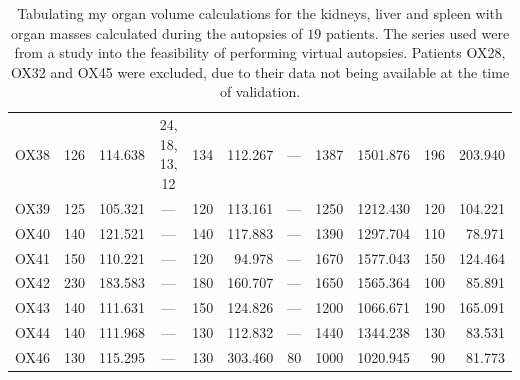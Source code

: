 \begin{landscape}
\begin{table}[p]
\begin{center}
\begin{tabular}{c|rrc|rrc|rr|rr}
OX38 & 126 & 114.638 & 24, 18, 13, 12 & 134 & 112.267 &                            --- & 1387 & 1501.876 & 196 & 203.940 \\
OX39 & 125 & 105.321 &            --- & 120 & 113.161 &                            --- & 1250 & 1212.430 & 120 & 104.221 \\
OX40 & 140 & 121.521 &            --- & 140 & 117.883 &                            --- & 1390 & 1297.704 & 110 &  78.971 \\
OX41 & 150 & 110.221 &            --- & 120 &  94.978 &                            --- & 1670 & 1577.043 & 150 & 124.464 \\
OX42 & 230 & 183.583 &            --- & 180 & 160.707 &                            --- & 1650 & 1565.364 & 100 &  85.891 \\
OX43 & 140 & 111.631 &            --- & 150 & 124.826 &                            --- & 1200 & 1066.671 & 190 & 165.091 \\
OX44 & 140 & 111.968 &            --- & 130 & 112.832 &                            --- & 1440 & 1344.238 & 130 &  83.531 \\
OX46 & 130 & 115.295 &            --- & 130 & 303.460 &                             80 & 1000 & 1020.945 &  90 &  81.773
\end{tabular}
\end{center}
\caption{Tabulating my organ volume calculations for the kidneys, liver and spleen with organ masses calculated during the autopsies of $19$ patients. The series used were from a study into the feasibility of performing virtual autopsies. Patients OX28, OX32 and OX45 were excluded, due to their data not being available at the time of validation.}
\label{tbl:validation-volcalc}
\end{table}
\end{landscape}




